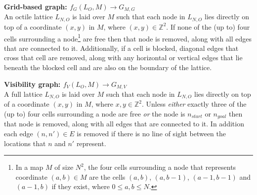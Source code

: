 \documentclass[12pt,notitlepage]{report}
\begin{document}
\begin{description}
\item{\bfseries Grid-based graph: $f_{G}(L_{O},M) \rightarrow G_{M,G}$}\\
An octile lattice $L_{N,O}$ is laid over $M$ such that each node in $L_{N,O}$ lies directly on top of a coordinate $(x,y)$ in $M$, where $(x,y) \in \mathbb{Z}^{2}$. If none of the (up to) four cells surrounding a node\footnote{In a map $M$ of size $N^{2}$, the four cells surrounding a node that represents coordinate $(a,b) \in M$ are the cells $(a,b)$, $(a,b-1)$, $(a-1,b-1)$ and $(a-1,b)$ if they exist, where $0 \leq a,b \leq N$.} are free then that node is removed, along with all edges that are connected to it. Additionally, if a cell is blocked, diagonal edges that cross that cell are removed, along with any horizontal or vertical edges that lie beneath the blocked cell and are also on the boundary of the lattice.

\item{\bfseries Visibility graph: $f_{V}(L_{O},M) \rightarrow G_{M,V}$}\\
A full lattice $L_{N,O}$ is laid over $M$ such that each node in $L_{N,O}$ lies directly on top of a coordinate $(x,y)$ in $M$, where $x,y \in \mathbb{Z}^{2}$. Unless {\em either} exactly three of the (up to) four cells surrounding a node are free {\em or} the node is $n_{start}$ or $n_{goal}$ then that node is removed, along with all edges that are connected to it. In addition each edge $(n,n') \in E$ is removed if there is no line of sight between the locations that $n$ and $n'$ represent.

\end{description}
\end{document}
